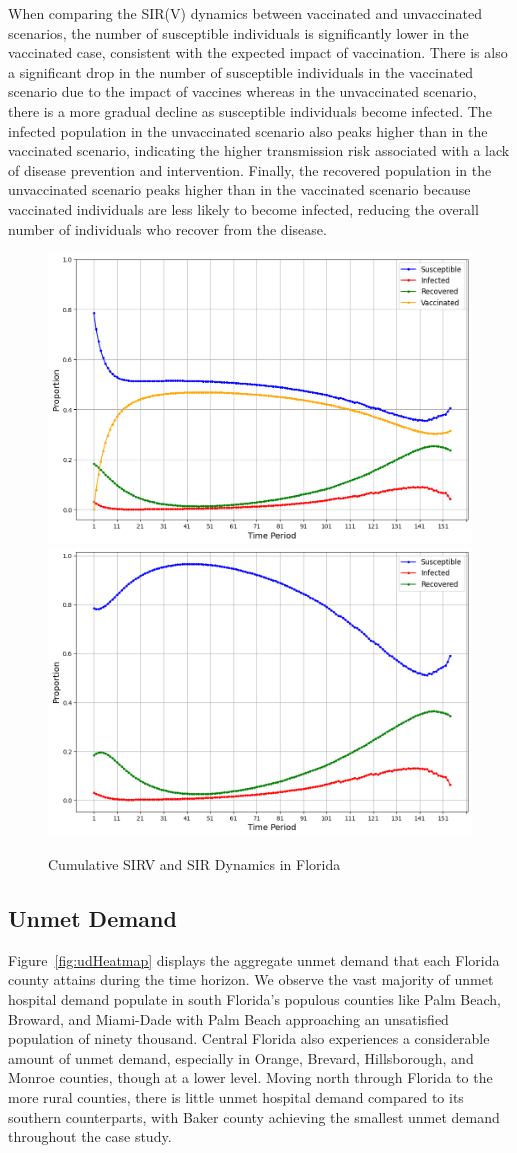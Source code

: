 \documentclass{article}
\begin{document}
When comparing the SIR(V) dynamics between vaccinated and unvaccinated scenarios, the number of susceptible individuals is significantly lower in the vaccinated case, consistent with the expected impact of vaccination. There is also a significant drop in the number of susceptible individuals in the vaccinated scenario due to the impact of vaccines whereas in the unvaccinated scenario, there is a more gradual decline as susceptible individuals become infected. The infected population in the unvaccinated scenario also peaks higher than in the vaccinated scenario, indicating the higher transmission risk associated with a lack of disease prevention and intervention. Finally, the recovered population in the unvaccinated scenario peaks higher than in the vaccinated scenario because vaccinated individuals are less likely to become infected, reducing the overall number of individuals who recover from the disease.

\begin{figure}
    \centering
    \includegraphics[width=0.43\linewidth]{pics/cumulSIRVDynamicsVax0.1.png}
    \includegraphics[width=0.43\linewidth]{pics/cumulSIRVDynamicsNoVax.png}
    \caption{Cumulative SIRV and SIR Dynamics in Florida}\label{fig:sir(v)Dynamics}
\end{figure}

\subsection{Unmet Demand}
Figure~\ref{fig:udHeatmap} displays the aggregate unmet demand that each Florida county attains during the time horizon. We observe the vast majority of unmet hospital demand populate in south Florida's populous counties like Palm Beach, Broward, and Miami-Dade with Palm Beach approaching an unsatisfied population of ninety thousand. Central Florida also experiences a considerable amount of unmet demand, especially in Orange, Brevard, Hillsborough, and Monroe counties, though at a lower level. Moving north through Florida to the more rural counties, there is little unmet hospital demand compared to its southern counterparts, with Baker county achieving the smallest unmet demand throughout the case study. 
\end{document}
